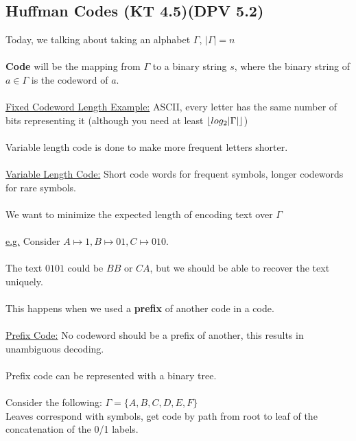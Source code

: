 \documentclass[12pt]{article}
\DeclarePairedDelimiter\floor{\lfloor}{\rfloor}
\begin{document}
\subsection{Huffman Codes (KT 4.5)(DPV 5.2)}

Today, we talking about taking an alphabet $\Gamma$, $|\Gamma| = n$\\
\\
\textbf{Code} will be the mapping from $\Gamma$ to a binary string $s$, where the binary string of $a\in\Gamma$ is the codeword of $a$.\\
\\
\underline{Fixed Codeword Length Example:} ASCII, every letter has the same number of bits representing it (although you need at least $\floor*{log_2 |\Gamma|}$)\\
\\
Variable length code is done to make more frequent letters shorter.\\
\\
\underline{Variable Length Code:} Short code words for frequent symbols, longer codewords for rare symbols.\\
\\
We want to minimize the expected length of encoding text over $\Gamma$\\
\\
\underline{e.g.} Consider $A\mapsto 1, B \mapsto 01, C \mapsto 010$.\\
\\
The text $0101$ could be $BB$ or $CA$, but we should be able to recover the text uniquely.\\
\\
This happens when we used a \textbf{prefix} of another code in a code.\\
\\
\underline{Prefix Code:} No codeword should be a prefix of another, this results in unambiguous decoding.\\
\\
Prefix code can be represented with a binary tree.\\
\\
Consider the following: $\Gamma = \{ A,B,C,D,E,F \}$\\
Leaves correspond with symbols, get code by path from root to leaf of the concatenation of the 0/1 labels.\\
\\
\end{document}
